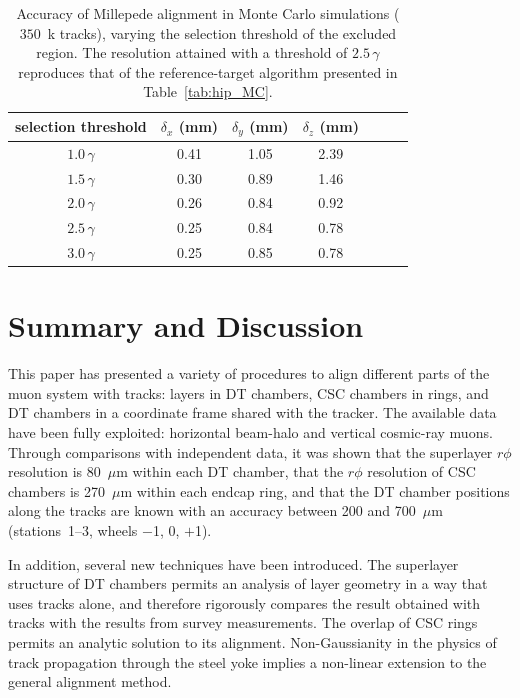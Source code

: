 \begin{table}
\caption{Accuracy of Millepede alignment in Monte Carlo simulations ($350$~k tracks), varying the selection threshold of the
excluded region.  The resolution attained with a threshold of
$2.5 \, \gamma$ reproduces that of the reference-target
algorithm presented in
Table~\ref{tab:hip_MC}. \label{tab:tailstudy}}
\renewcommand{\arraystretch}{1.5}
\begin{center}
\begin{tabular}{c | c c c c c c}
\hline\hline selection threshold & $\delta_x$ (mm) & $\delta_y$ (mm) & $\delta_z$ (mm) \\\hline
$1.0 \, \gamma$ & 0.41 & 1.05 & 2.39 \\
$1.5 \, \gamma$ & 0.30 & 0.89 & 1.46 \\
$2.0 \, \gamma$ & 0.26 & 0.84 & 0.92 \\
$2.5 \, \gamma$ & 0.25 & 0.84 & 0.78 \\
$3.0 \, \gamma$ & 0.25 & 0.85 & 0.78 \\\hline\hline
\end{tabular}
\end{center}
\end{table}

\section{Summary and Discussion}

This paper has presented a variety of procedures to align
different parts of the muon system with tracks: layers in DT chambers,
CSC chambers in rings, and DT chambers in a coordinate frame shared
with the tracker.  The available data have been fully exploited:
horizontal beam-halo and vertical cosmic-ray muons.  Through
comparisons with independent data, it was shown that the superlayer
$r\phi$ resolution is 80~$\mu$m within each DT chamber, that the
$r\phi$ resolution of CSC chambers is 270~$\mu$m within each endcap
ring, and that the DT chamber positions along the tracks are known
with an accuracy between 200 and 700~$\mu$m (stations~1--3, wheels $-$1, 0,
$+$1).

In addition, several new techniques have been introduced.  The
superlayer structure of DT chambers permits an analysis of layer
geometry in a way that uses tracks alone, and therefore rigorously
compares the result obtained with tracks with the results from survey
measurements.  The overlap of CSC rings permits an analytic solution
to its alignment.  Non-Gaussianity in the physics of track propagation through the steel
yoke implies a non-linear extension to the general alignment method.

